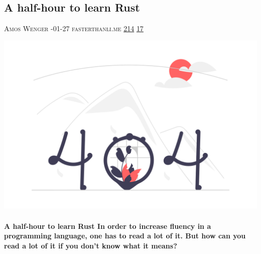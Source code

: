 \documentclass[10pt,a4paper]{article}
\begin{document}
\begin{multicols*}{2}
\begin{minipage}{\linewidth}
\subsection{A half-hour to learn Rust}
\textsc{\footnotesize
{\scriptsize\faUser}\space 
Amos Wenger 
{\scriptsize\faCalendar}-01-27 
{\scriptsize\faGlobe}\space 
fasterthanli.me 
{\scriptsize\faThumbsOUp}\space 
\href{http://news.ycombinator.com/item?id=37236916\&utm\_term=comment}{214} 
{\scriptsize\faComments}\space 
\href{http://news.ycombinator.com/item?id=37236916\&utm\_term=comment}{17} 
}
\par\medskip\noindent
\href{https://fasterthanli.me/articles/a-half-hour-to-learn-rust?utm\_source=hackernewsletter\&utm\_medium=email\&utm\_term=code}{
    \includegraphics[width=0.99\linewidth]{notfound.png}
}
\end{minipage}
\paragraph{}
\textbf{A half-hour to learn Rust
In order to increase fluency in a programming language, one has to read a lot of it. But how can you read a lot of it if you don't know what it means?}
\paragraph{}


\end{multicols*}
\end{document}
